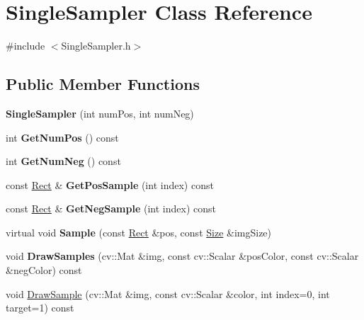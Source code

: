 \hypertarget{classSingleSampler}{}\section{Single\+Sampler Class Reference}
\label{classSingleSampler}


{\ttfamily \#include $<$Single\+Sampler.\+h$>$}

\subsection*{Public Member Functions}
\begin{DoxyCompactItemize}
\item 
\hypertarget{classSingleSampler_ac8afcdb74dfa26de9e686879eb2062fd}{}{\bfseries Single\+Sampler} (int num\+Pos, int num\+Neg)\label{classSingleSampler_ac8afcdb74dfa26de9e686879eb2062fd}

\item 
\hypertarget{classSingleSampler_aea28b8157e66fff3bf2d919638d6bf8f}{}int {\bfseries Get\+Num\+Pos} () const \label{classSingleSampler_aea28b8157e66fff3bf2d919638d6bf8f}

\item 
\hypertarget{classSingleSampler_a2c615500fb49179a6a7ab606e19d5438}{}int {\bfseries Get\+Num\+Neg} () const \label{classSingleSampler_a2c615500fb49179a6a7ab606e19d5438}

\item 
\hypertarget{classSingleSampler_a5cd8387d318cfa166763efa601c6a016}{}const \hyperlink{classRect}{Rect} \& {\bfseries Get\+Pos\+Sample} (int index) const \label{classSingleSampler_a5cd8387d318cfa166763efa601c6a016}

\item 
\hypertarget{classSingleSampler_a5b07ba58d23e251a745752185d474995}{}const \hyperlink{classRect}{Rect} \& {\bfseries Get\+Neg\+Sample} (int index) const \label{classSingleSampler_a5b07ba58d23e251a745752185d474995}

\item 
\hypertarget{classSingleSampler_a0211ef10f190b5b9e56a7103e8437b19}{}virtual void {\bfseries Sample} (const \hyperlink{classRect}{Rect} \&pos, const \hyperlink{classSize}{Size} \&img\+Size)\label{classSingleSampler_a0211ef10f190b5b9e56a7103e8437b19}

\item 
\hypertarget{classSingleSampler_a38a0df4f2d8d190708921df130c6fbb1}{}void {\bfseries Draw\+Samples} (cv\+::\+Mat \&img, const cv\+::\+Scalar \&pos\+Color, const cv\+::\+Scalar \&neg\+Color) const \label{classSingleSampler_a38a0df4f2d8d190708921df130c6fbb1}

\item 
void \hyperlink{classSingleSampler_a8be19d5fe2cba8f042835df152e2e4d4}{Draw\+Sample} (cv\+::\+Mat \&img, const cv\+::\+Scalar \&color, int index=0, int target=1) const 
\end{DoxyCompactItemize}

